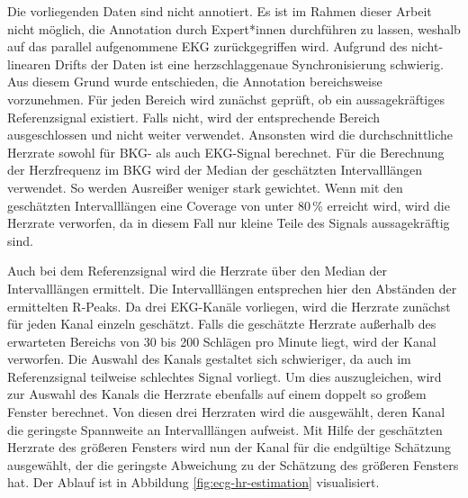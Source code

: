 	Die vorliegenden Daten sind nicht annotiert. Es ist im Rahmen dieser Arbeit nicht möglich, die Annotation durch Expert*innen durchführen zu lassen, weshalb auf das parallel aufgenommene \ac{EKG} zurückgegriffen wird. Aufgrund des nicht-linearen Drifts der Daten ist eine herzschlaggenaue Synchronisierung schwierig. Aus diesem Grund wurde entschieden, die Annotation bereichsweise vorzunehmen. Für jeden Bereich wird zunächst geprüft, ob ein aussagekräftiges Referenzsignal existiert. Falls nicht, wird der entsprechende Bereich ausgeschlossen und nicht weiter verwendet. Ansonsten wird die durchschnittliche Herzrate sowohl für BKG- als auch EKG-Signal berechnet. Für die Berechnung der Herzfrequenz im \ac{BKG} wird der Median der geschätzten Intervalllängen verwendet. So werden Ausreißer weniger stark gewichtet. Wenn mit den geschätzten Intervalllängen eine Coverage von unter 80\,\% erreicht wird, wird die Herzrate verworfen, da in diesem Fall nur kleine Teile des Signals aussagekräftig sind.
	
	Auch bei dem Referenzsignal wird die Herzrate über den Median der Intervalllängen ermittelt. Die Intervalllängen entsprechen hier den Abständen der ermittelten R-Peaks. Da drei \ac{EKG}-Kanäle vorliegen, wird die Herzrate zunächst für jeden Kanal einzeln geschätzt. Falls die geschätzte Herzrate außerhalb des erwarteten Bereichs von 30 bis 200 Schlägen pro Minute liegt, wird der Kanal verworfen. Die Auswahl des Kanals gestaltet sich schwieriger, da auch im Referenzsignal teilweise schlechtes Signal vorliegt. Um dies auszugleichen, wird zur Auswahl des Kanals die Herzrate ebenfalls auf einem doppelt so großem Fenster berechnet. Von diesen drei Herzraten wird die ausgewählt, deren Kanal die geringste Spannweite an Intervalllängen aufweist. Mit Hilfe der geschätzten Herzrate des größeren Fensters wird nun der Kanal für die endgültige Schätzung ausgewählt, der die geringste Abweichung zu der Schätzung des größeren Fensters hat. Der Ablauf ist in Abbildung \ref{fig:ecg-hr-estimation} visualisiert.
	
